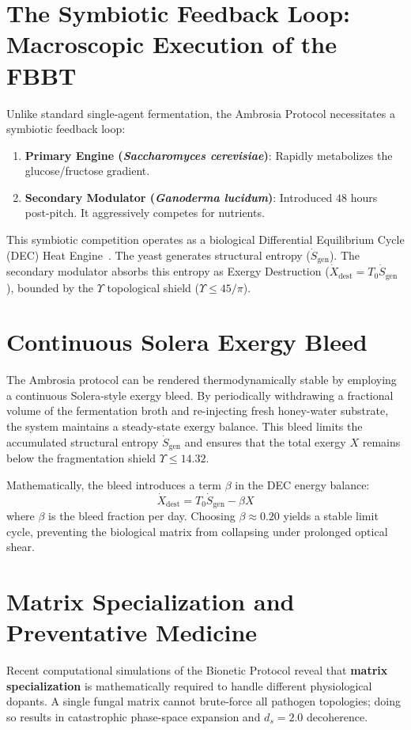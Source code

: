 \section{The Symbiotic Feedback Loop: Macroscopic Execution of the FBBT}
Unlike standard single-agent fermentation, the Ambrosia Protocol necessitates a symbiotic feedback loop:
\begin{enumerate}
    \item \textbf{Primary Engine (\textit{Saccharomyces cerevisiae})}: Rapidly metabolizes the glucose/fructose gradient.
    \item \textbf{Secondary Modulator (\textit{Ganoderma lucidum})}: Introduced $48$ hours post-pitch. It aggressively competes for nutrients.
\end{enumerate}
This symbiotic competition operates as a biological Differential Equilibrium Cycle (DEC) Heat Engine~\cite{lc}. The yeast generates structural entropy ($\dot{S}_{\mathrm{gen}}$). The secondary modulator absorbs this entropy as Exergy Destruction ($\dot{X}_{\mathrm{dest}} = T_0 \dot{S}_{\mathrm{gen}}$), bounded by the $\Upsilon$ topological shield ($\Upsilon \leq 45/\pi$). 

\section{Continuous Solera Exergy Bleed}
The Ambrosia protocol can be rendered thermodynamically stable by employing a continuous Solera-style exergy bleed. By periodically withdrawing a fractional volume of the fermentation broth and re-injecting fresh honey-water substrate, the system maintains a steady-state exergy balance. This bleed limits the accumulated structural entropy $\dot{S}_{\mathrm{gen}}$ and ensures that the total exergy $X$ remains below the fragmentation shield $\Upsilon \leq 14.32$.

Mathematically, the bleed introduces a term $\beta$ in the DEC energy balance:
\begin{equation}
\dot{X}_{\mathrm{dest}} = T_0 \dot{S}_{\mathrm{gen}} - \beta X
\end{equation}
where $\beta$ is the bleed fraction per day. Choosing $\beta \approx 0.20$ yields a stable limit cycle, preventing the biological matrix from collapsing under prolonged optical shear.

\section{Matrix Specialization and Preventative Medicine}
Recent computational simulations of the Bionetic Protocol reveal that \textbf{matrix specialization} is mathematically required to handle different physiological dopants. A single fungal matrix cannot brute-force all pathogen topologies; doing so results in catastrophic phase-space expansion and $d_s = 2.0$ decoherence.

